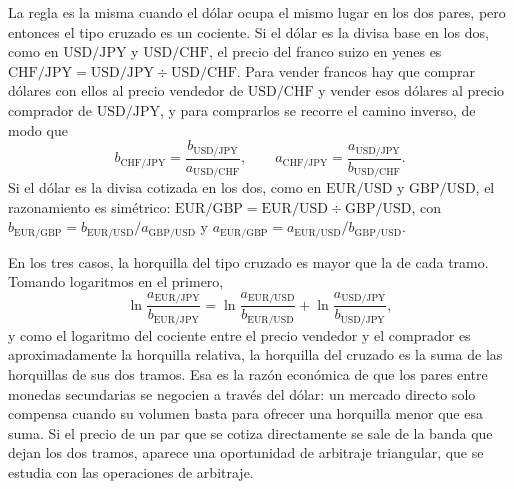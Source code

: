 \documentclass[10pt,a4paper]{article}
\begin{document}
La regla es la misma cuando el dólar ocupa el mismo lugar en los dos pares, pero entonces el tipo cruzado es un cociente. Si el dólar es la divisa base en los dos, como en $\mathrm{USD/JPY}$ y $\mathrm{USD/CHF}$, el precio del franco suizo en yenes es $\mathrm{CHF/JPY}=\mathrm{USD/JPY}\div\mathrm{USD/CHF}$. Para vender francos hay que comprar dólares con ellos al precio vendedor de $\mathrm{USD/CHF}$ y vender esos dólares al precio comprador de $\mathrm{USD/JPY}$, y para comprarlos se recorre el camino inverso, de modo que
$$b_{\mathrm{CHF/JPY}}=\frac{b_{\mathrm{USD/JPY}}}{a_{\mathrm{USD/CHF}}},\qquad a_{\mathrm{CHF/JPY}}=\frac{a_{\mathrm{USD/JPY}}}{b_{\mathrm{USD/CHF}}}.$$
Si el dólar es la divisa cotizada en los dos, como en $\mathrm{EUR/USD}$ y $\mathrm{GBP/USD}$, el razonamiento es simétrico: $\mathrm{EUR/GBP}=\mathrm{EUR/USD}\div\mathrm{GBP/USD}$, con $b_{\mathrm{EUR/GBP}}=b_{\mathrm{EUR/USD}}/a_{\mathrm{GBP/USD}}$ y $a_{\mathrm{EUR/GBP}}=a_{\mathrm{EUR/USD}}/b_{\mathrm{GBP/USD}}$.

En los tres casos, la horquilla del tipo cruzado es mayor que la de cada tramo. Tomando logaritmos en el primero,
$$\ln\frac{a_{\mathrm{EUR/JPY}}}{b_{\mathrm{EUR/JPY}}}=\ln\frac{a_{\mathrm{EUR/USD}}}{b_{\mathrm{EUR/USD}}}+\ln\frac{a_{\mathrm{USD/JPY}}}{b_{\mathrm{USD/JPY}}},$$
y como el logaritmo del cociente entre el precio vendedor y el comprador es aproximadamente la horquilla relativa, la horquilla del cruzado es la suma de las horquillas de sus dos tramos. Esa es la razón económica de que los pares entre monedas secundarias se negocien a través del dólar: un mercado directo solo compensa cuando su volumen basta para ofrecer una horquilla menor que esa suma. Si el precio de un par que se cotiza directamente se sale de la banda que dejan los dos tramos, aparece una oportunidad de arbitraje triangular, que se estudia con las operaciones de arbitraje.
\end{document}

